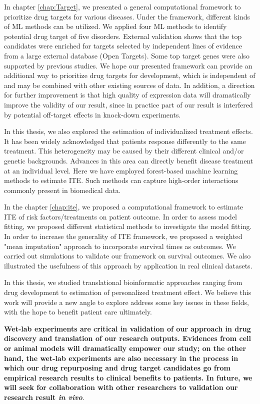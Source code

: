   In chapter \ref{chap:Target}, we presented a general computational framework to prioritize drug targets for various diseases. Under the framework, different kinds of ML methods can be utilized. We applied four ML methods to identify potential drug target of five disorders. External validation shows that the top candidates were enriched for targets selected by independent lines of evidence from a large external database (Open Targets). Some top target genes were also supported by previous studies. We hope our presented framework can provide an additional way to prioritize drug targets for development, which is independent of and may be combined with other existing sources of data. In addition, a direction for further improvement is that high quality of expression data will dramatically improve the validity of our result, since in practice part of our result is interfered by potential off-target effects in knock-down experiments. 
  
  In this thesis, we also explored the estimation of individualized treatment effects. It has been widely acknowledged that patients response differently to the same treatment. This heterogeneity may be caused by their different clinical and/or genetic backgrounds. Advances in this area can directly benefit disease treatment at an individual level. Here we have employed forest-based machine learning methods  to estimate ITE. Such methods can capture high-order interactions commonly present in biomedical data.

  In the chapter \ref{chap:ite}, we proposed a computational framework to estimate ITE of risk factors/treatments on patient outcome. In order to assess model fitting, we proposed different statistical methods to investigate the model fitting. In order to increase the generality of ITE framework, we proposed a weighted "mean imputation" approach to incorporate survival times as outcomes. We carried out simulations to validate our framework on survival outcomes. We also illustrated the usefulness of this approach by application in real clinical datasets. 

  In this thesis, we studied translational bioinformatic approaches ranging from drug development to estimation of personalized treatment effect. We believe this work will provide a new angle to explore address some key issues in these fields, with the hope to benefit patient care ultimately.

  \textbf{Wet-lab experiments are critical in validation of our approach in drug discovery and translation of our research outputs. Evidences from cell or animal models will dramatically empower our study; on the other hand, the wet-lab experiments are also necessary in the process in which our drug repurposing and drug target candidates go from empirical research results to clinical benefits to patients. In future, we will seek for collaboration with other researchers to validation our research result \textit{in vivo}}.
\chapterend

